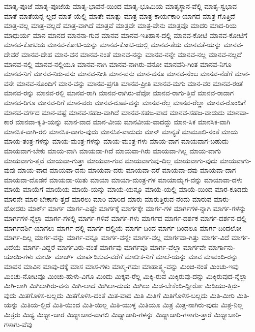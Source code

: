 {ಮಾತೃ-ಪೂಜೆ
ಮಾತೃ-ಪೂಜೆಯ
ಮಾತೃ-ಭಾವನೆ-ಯಿಂದ
ಮಾತೃ-ಭೂಮಿಯ
ಮಾತೃಸ್ಥಾನ-ವೆಲ್ಲಿ
ಮಾತೃ-ಸ್ವಭಾವ
ಮಾತೆ
ಮಾತೆಯನ್ನ-ಲ್ಲದೆ
ಮಾತೆ-ಯೆಲ್ಲಿ
ಮಾತೇ
ಮಾತ್ನು
ಮಾತ್ರ
ಮಾತ್ರ-ಕಾರ್ಯಕಾರಿ-ಯಾಗದ
ಮಾತ್ರ-ಗೊತ್ತಿದೆ
ಮಾತ್ರ-ವಲ್ಲ
ಮಾತ್ರ-ವಲ್ಲದೆ
ಮಾತ್ರ-ವಾಗಿದೆ
ಮಾತ್ರವೆ
ಮಾತ್ರವೇ
ಮಾತ್ರ-ವೇನು
ಮಾತ್ರವೊ
ಮಾದರಿ
ಮಾದ-ರಿಯ
ಮಾಧುರ್ಯ
ಮಾನ
ಮಾನದ
ಮಾನನಾ-ಗುವ
ಮಾನವ
ಮಾನವ-ಇತಿಹಾಸ-ದಲ್ಲಿ
ಮಾನವ-ಕೋಟಿ
ಮಾನವ-ಕೋಟಿಗೆ
ಮಾನವ-ಕೋಟಿಯ
ಮಾನವ-ಕೋಟಿ-ಯನ್ನು
ಮಾನವ-ಕೋಟಿ-ಯಲ್ಲಿ
ಮಾನವ-ತೆಯ
ಮಾನವತೆ-ಯನ್ನು
ಮಾನವ-ದೇವರೆ
ಮಾನವ-ದೇಹ
ಮಾನ-ವನ
ಮಾನವ-ನಂತೆ
ಮಾನವ-ನನ್ನು
ಮಾನವ-ನನ್ನೇ
ಮಾನವ-ನಲ್ಲ
ಮಾನವ-ನಲ್ಲದೆ
ಮಾನವ-ನಲ್ಲಿ
ಮಾನವ-ನಲ್ಲಿಯೂ
ಮಾನವ-ನಾಗಿ
ಮಾನವ-ನಾಗಿರು-ವನೋ
ಮಾನವನಿ-ಗಿಂತ
ಮಾನವ-ನಿಗೂ
ಮಾನವ-ನಿಗೆ
ಮಾನವ-ನಿರು-ವನು
ಮಾನವ-ನೀತಿ
ಮಾನ-ವನು
ಮಾನ-ವನೂ
ಮಾನವ-ನೆಂಬ
ಮಾನವ-ನೆಡೆಗೆ
ಮಾನ-ವನೇ
ಮಾನವ-ನೊಂದಿಗೆ
ಮಾನ-ವನ್ನು
ಮಾನವ-ಪ್ರಗತಿ
ಮಾನವ-ಪ್ರೀತಿ
ಮಾನವ-ಮಗು
ಮಾನ-ವರ
ಮಾನವ-ರಂತೆ
ಮಾನವ-ರನ್ನು
ಮಾನವ-ರಲ್ಲಿ
ಮಾನವ-ರಾಗಿ
ಮಾನವ-ರಾಗಿರು-ವೆವೋ
ಮಾನವ-ರಾಗು-ತ್ತಿವೆ
ಮಾನವ-ರಾದಾಗ
ಮಾನವ-ರಿಗೂ
ಮಾನವ-ರಿಗೆ
ಮಾನ-ವರು
ಮಾನವ-ರೂಪ-ವನ್ನು
ಮಾನವ-ರೆಲ್ಲ
ಮಾನವ-ರೆಲ್ಲಾ
ಮಾನವ-ರೊಂದಿಗೆ
ಮಾನವ-ವರ್ಗದ
ಮಾನ-ವಷ್ಟೆ
ಮಾನವ-ಸಹಜ-ವಾಗಿದೆ
ಮಾನವ-ಸಹಜ-ವಾದ
ಮಾನವ-ಸಹಜ-ವಾದುದು
ಮಾನವಾ-ಕಾರ
ಮಾನವಾ-ಕೃತಿ-ಯನ್ನು
ಮಾನ-ವಾದ
ಮಾನ-ವೀಯ
ಮಾನವೀಯ-ವಾದದ್ದು
ಮಾನ-ಸಿಕ
ಮಾನಸಿಕ-ವಾಗಿ
ಮಾನಸಿಕ-ವಾಗಿ-ರಲಿ
ಮಾನಸಿಕ-ವಾಗು-ವುದು
ಮಾನಸಿಕ-ವಾದುದು
ಮಾನ್
ಮಾನ್ಯತೆ
ಮಾಮೂಲಿ-ನಂತೆ
ಮಾಯ
ಮಾಯ-ತಂತ್ರ-ಗಳನ್ನು
ಮಾಯ-ಮಂತ್ರ-ಗಳನ್ನು
ಮಾಯ-ಮಂತ್ರ-ಗಳು
ಮಾಯ-ವಾಗ
ಮಾಯವಾಗ-ಬಹುದು
ಮಾಯವಾಗ-ಬೇಕು
ಮಾಯ-ವಾಗಿ
ಮಾಯವಾ-ಗಿದೆ
ಮಾಯವಾ-ಗಿರು
ಮಾಯವಾ-ಗಿಲ್ಲ
ಮಾಯ-ವಾಗು
ಮಾಯವಾಗು-ತ್ತವೆ
ಮಾಯವಾ-ಗುತ್ತಾ
ಮಾಯವಾ-ಗುವ
ಮಾಯವಾಗುವು-ದಿಲ್ಲ
ಮಾಯವಾಗು-ವುದು
ಮಾಯವಾಗು-ವುವು
ಮಾಯ-ವಾದ
ಮಾಯವಾ-ದನು
ಮಾಯವಾ-ದರು
ಮಾಯವಾ-ದರೆ
ಮಾಯವಾ-ದವು
ಮಾಯವಾ-ದಾಗ
ಮಾಯವಾ-ದೊಡನೆ
ಮಾಯವಾ-ಯಿತು
ಮಾಯಾ
ಮಾಯಾ-ಮಂತ್ರ-ಗಳ
ಮಾಯಾಮೃಗ-ವನ್ನು
ಮಾಯಾವಾ-ದಳು
ಮಾಯೆ
ಮಾಯೆಗೆ
ಮಾಯೆಯ
ಮಾಯೆ-ಯನ್ನು
ಮಾಯೆ-ಯನ್ನೂ
ಮಾಯೆ-ಯಲ್ಲಿ
ಮಾಯೆ-ಯಿಂದ
ಮಾರ-ಕೂಡದು
ಮಾರನೇ
ಮಾರ-ಬೇಕಾಗು-ತ್ತದೆ
ಮಾರಲು
ಮಾರಿ
ಮಾರಿದ
ಮಾರು
ಮಾರುತ್ತಿರುವ-ನೆಂದು
ಮಾರುವ
ಮಾರು-ಹೋದರು
ಮಾರ್ಕ್
ಮಾರ್ಗ
ಮಾರ್ಗ-ಎಷ್ಟೇ
ಮಾರ್ಗಕ್ಕೆ
ಮಾರ್ಗಕ್ಕೇ
ಮಾರ್ಗ-ಗಳ
ಮಾರ್ಗಗಳ-ನ್ನಾಗಿ
ಮಾರ್ಗ-ಗಳನ್ನು
ಮಾರ್ಗಗಳ-ನ್ನೆಲ್ಲಾ
ಮಾರ್ಗ-ಗಳಲ್ಲಿ
ಮಾರ್ಗ-ಗಳಿವೆ
ಮಾರ್ಗ-ಗಳು
ಮಾರ್ಗದ
ಮಾರ್ಗ-ದರ್ಶಕ
ಮಾರ್ಗ-ದರ್ಶನ-ದಲ್ಲಿ
ಮಾರ್ಗದರ್ಶಿ-ಯಾಗಲು
ಮಾರ್ಗ-ದಲ್ಲಿ
ಮಾರ್ಗ-ದಲ್ಲಿಯೆ
ಮಾರ್ಗ-ದಿಂದ
ಮಾರ್ಗ-ದಿಂದಲೂ
ಮಾರ್ಗ-ದಿಂದಲೋ
ಮಾರ್ಗ-ದಿಲ್ಲ
ಮಾರ್ಗ-ವನ್ನು
ಮಾರ್ಗ-ವನ್ನೂ
ಮಾರ್ಗ-ವನ್ನೇ
ಮಾರ್ಗ-ವಲ್ಲ
ಮಾರ್ಗವಾ-ಗಿತ್ತು
ಮಾರ್ಗ-ವಿದೆ
ಮಾರ್ಗ-ವಿದೆಯೆ
ಮಾರ್ಗ-ವಿದ್ದರೆ
ಮಾರ್ಗವಿರು-ವಂತೆ
ಮಾರ್ಗವು
ಮಾರ್ಗವೂ
ಮಾರ್ಗ-ವೆಲ್ಲಾ
ಮಾರ್ಗವೇ
ಮಾರ್ಗಾನು-ಯಾಯಿ-ಗಳು
ಮಾರ್ಚಿ
ಮಾರ್ಚ್
ಮಾರ್ಪಡಿಸುವ-ವರೆಗೆ
ಮಾಲೀಕ-ನಿಗೆ
ಮಾಲೆ-ಯನ್ನು
ಮಾವ
ಮಾವಂದಿ-ರನ್ನು
ಮಾವನ
ಮಾವಿನ
ಮಾವು-ದಕ್ಕೆ
ಮಾಸ
ಮಾಸ-ಗಳು
ಮಾಸ್ಮ-ಗಮಃ
ಮಾಹಾತ್ಮ್ಯ-ವನ್ನು
ಮಿಂಚಿ-ನಂತೆ
ಮಿಂಚು-ಇವು
ಮಿಂಚು-ನೋಟವೂ
ಮಿಂಚು-ಹುಳು-ವಿಗೂ
ಮಿಂದು
ಮಿಕ್ಕವ-ರೆಲ್ಲ
ಮಿಕ್ಕಿ-ರುವ
ಮಿಕ್ಕಿರುವು-ದನ್ನು
ಮಿಕ್ಕಿರುವುದ-ನ್ನೆಲ್ಲಾ
ಮಿಗಿ-ಲಾಗಿ
ಮಿಗಿಲಾಗಿರು-ವನು
ಮಿಗಿ-ಲಾದ
ಮಿಗಿಲಾ-ದುದು
ಮಿಗಿಲು
ಮಿಡ-ಬೇಕೆಂದಿ-ದ್ದೀರೋ
ಮಿಡಿಯು-ತ್ತಿರು-ವುದು
ಮಿತಗೊಳಿಸ-ಬಲ್ಲದು
ಮಿತಗೊಳಿಸಿ-ದಂತೆ
ಮಿತ-ವಾದ
ಮಿತಿ
ಮಿತಿಗೆ
ಮಿತಿಗೊಳಿಸ-ಬಲ್ಲದು
ಮಿತಿ-ಮೀರಿ
ಮಿತಿ-ಯನ್ನು
ಮಿತಿಯ-ಲ್ಲಿದೆ
ಮಿತಿ-ಯಿಂದ
ಮಿತಿ-ಯಿಲ್ಲ
ಮಿತಿ-ಯುಳ್ಳ
ಮಿತಿಯೂ
ಮಿತ್ರ
ಮಿತ್ರ-ನಾಗಿರು-ವುದು
ಮಿತ್ರ-ನಿಲ್ಲ
ಮಿತ್ರರು
ಮಿಥ್ಯ
ಮಿಥ್ಯಾ-ಚಾರ
ಮಿಥ್ಯಾಚಾರ-ವಾಗಲಿ
ಮಿಥ್ಯಾಚಾರಿ-ಗಳನ್ನು
ಮಿಥ್ಯಾಚಾರಿ-ಗಳಾಗು-ತ್ತಾರೆ
ಮಿಥ್ಯಾಚಾರಿ-ಗಳಾಗು-ವೆವು
}
